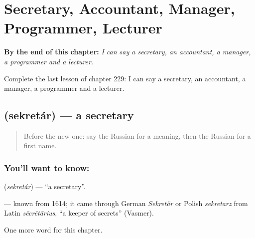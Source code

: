 
\chapter{Secretary, Accountant, Manager, Programmer, Lecturer}
\label{ch:ru-secretary-accountant-manager-programmer-lecturer}

\begin{chapteropening}
\textbf{By the end of this chapter:} \emph{I can say a secretary, an accountant, a manager, a programmer and a lecturer.}

Complete the last lesson of chapter 229: I can say a secretary, an accountant, a manager, a programmer and a lecturer.
\end{chapteropening}

\section[\texorpdfstring{\ru{секретарь} (sekretár)}{секретарь (sekretár)}]{ (sekretár) — a secretary}

\label{lesson:RU-C229-sekretar}



\begin{quote}
Before the new one: say the Russian for a meaning, then the Russian for a first name.
\end{quote}

\subsection*{You'll want to know: }
\textbf{} (\emph{sekretár}) — \textquotedblleft{}a secretary\textquotedblright{}.

\begin{cousinweb}
\textbf{} — known from 1614; it came through German \emph{Sekretär} or Polish \emph{sekretarz} from Latin \emph{sēcrētārius}, \textquotedblleft{}a keeper of secrets\textquotedblright{} (Vasmer).
\end{cousinweb}

\begin{grammarlens}[title={What you've built}]
One more word for this chapter.
\end{grammarlens}

